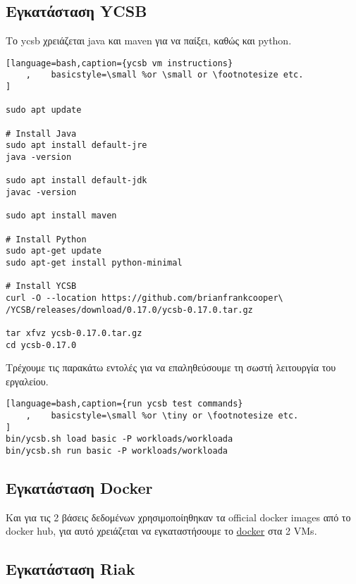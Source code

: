\documentclass[conference]{IEEEtran}
\begin{document}
\subsection{Εγκατάσταση YCSB}

Το ycsb χρειάζεται java και maven για να παίξει, καθώς και python.

\begin{lstlisting}[language=bash,caption={ycsb vm instructions}
    ,    basicstyle=\small %or \small or \footnotesize etc.
]

sudo apt update

# Install Java
sudo apt install default-jre
java -version

sudo apt install default-jdk
javac -version

sudo apt install maven

# Install Python 
sudo apt-get update
sudo apt-get install python-minimal

# Install YCSB
curl -O --location https://github.com/brianfrankcooper\
/YCSB/releases/download/0.17.0/ycsb-0.17.0.tar.gz

tar xfvz ycsb-0.17.0.tar.gz
cd ycsb-0.17.0
\end{lstlisting}

Τρέχουμε τις παρακάτω εντολές για να επαληθεύσουμε τη σωστή λειτουργία του εργαλείου.

\begin{lstlisting}[language=bash,caption={run ycsb test commands}
    ,    basicstyle=\small %or \tiny or \footnotesize etc.
]
bin/ycsb.sh load basic -P workloads/workloada
bin/ycsb.sh run basic -P workloads/workloada

\end{lstlisting}



\subsection{Εγκατάσταση Docker}
Και για τις 2 βάσεις δεδομένων χρησιμοποίηθηκαν τα official docker images από το docker hub, για αυτό χρειάζεται να εγκαταστήσουμε το 
\href{https://docs.docker.com/engine/install/ubuntu/}{docker}
στα 2 VMs. 


\subsection{Εγκατάσταση Riak}
\end{document}
